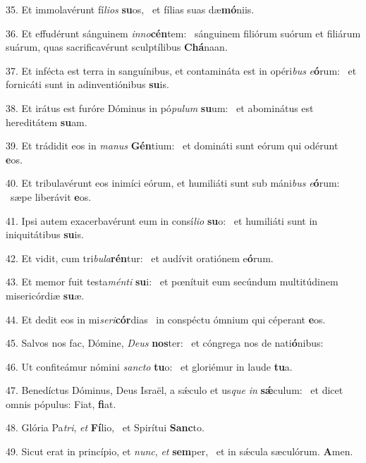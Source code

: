35. Et immolavérunt fí\textit{li}\textit{os} \textbf{su}os, \ast\  et fílias suas dæ\textbf{mó}niis.\

36. Et effudérunt sánguinem \textit{in}\textit{no}\textbf{cén}tem: \ast\  sánguinem filiórum suórum et filiárum suárum, quas sacrificavérunt sculptílibus \textbf{Chá}naan.\

37. Et infécta est terra in sanguínibus, et contamináta est in opéri\textit{bus} \textit{e}\textbf{ó}rum: \ast\  et fornicáti sunt in adinventiónibus \textbf{su}is.\

38. Et irátus est furóre Dóminus in pó\textit{pu}\textit{lum} \textbf{su}um: \ast\  et abominátus est hereditátem \textbf{su}am.\

39. Et trádidit eos in \textit{ma}\textit{nus} \textbf{Gén}tium: \ast\  et domináti sunt eórum qui odérunt \textbf{e}os.\

40. Et tribulavérunt eos inimíci eórum, et humiliáti sunt sub máni\textit{bus} \textit{e}\textbf{ó}rum: \ast\  sæpe liberávit \textbf{e}os.\

41. Ipsi autem exacerbavérunt eum in consí\textit{li}\textit{o} \textbf{su}o: \ast\  et humiliáti sunt in iniquitátibus \textbf{su}is.\

42. Et vidit, cum tri\textit{bu}\textit{la}\textbf{rén}tur: \ast\  et audívit oratiónem e\textbf{ó}rum.\

43. Et memor fuit testa\textit{mén}\textit{ti} \textbf{su}i: \ast\  et pœnítuit eum secúndum multitúdinem misericórdiæ \textbf{su}æ.\

44. Et dedit eos in mi\textit{se}\textit{ri}\textbf{cór}dias \ast\  in conspéctu ómnium qui céperant \textbf{e}os.\

45. Salvos nos fac, Dómine, \textit{De}\textit{us} \textbf{nos}ter: \ast\  et cóngrega nos de nati\textbf{ó}nibus:\

46. Ut confiteámur nómini \textit{sanc}\textit{to} \textbf{tu}o: \ast\  et gloriémur in laude \textbf{tu}a.\

47. Benedíctus Dóminus, Deus Israël, a sǽculo et us\textit{que} \textit{in} \textbf{sǽ}culum: \ast\  et dicet omnis pópulus: Fiat, \textbf{fi}at.\

48. Glória Pa\textit{tri}, \textit{et} \textbf{Fí}lio, \ast\  et Spirítui \textbf{Sanc}to.\

49. Sicut erat in princípio, et \textit{nunc}, \textit{et} \textbf{sem}per, \ast\  et in sǽcula sæculórum. \textbf{A}men.\

